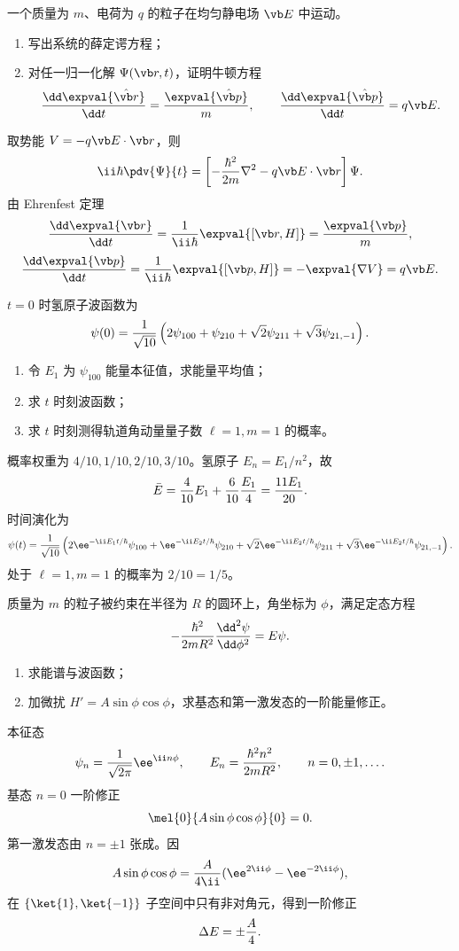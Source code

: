 
\begin{question}
一个质量为 $m$、电荷为 $q$ 的粒子在均匀静电场 $\vb E$ 中运动。
\begin{enumerate}
  \item 写出系统的薛定谔方程；
  \item 对任一归一化解 $\Psi(\vb r,t)$，证明牛顿方程
  \[
    {\dd\expval{\hat{\vb r}}\over\dd t}={\expval{\hat{\vb p}}\over m},
    \qquad {\dd\expval{\hat{\vb p}}\over\dd t}=q\vb E.
  \]
\end{enumerate}
\begin{solution}
取势能 $V=-q\vb E\cdot\vb r$，则
\[
  \ii\hbar\pdv{\Psi}{t}=\left[-{\hbar^2\over2m}\nabla^2-q\vb E\cdot\vb r\right]\Psi.
\]
由 Ehrenfest 定理
\[
  {\dd\expval{\vb r}\over\dd t}={1\over\ii\hbar}\expval{[\vb r,H]}={\expval{\vb p}\over m},
\]
\[
  {\dd\expval{\vb p}\over\dd t}={1\over\ii\hbar}\expval{[\vb p,H]}=-\expval{\nabla V}=q\vb E.
\]
\end{solution}
\end{question}

\begin{question}
$t=0$ 时氢原子波函数为
\[
  \psi(0)={1\over\sqrt{10}}\left(2\psi_{100}+\psi_{210}+\sqrt2\psi_{211}+\sqrt3\psi_{21,-1}\right).
\]
\begin{enumerate}
  \item 令 $E_1$ 为 $\psi_{100}$ 能量本征值，求能量平均值；
  \item 求 $t$ 时刻波函数；
  \item 求 $t$ 时刻测得轨道角动量量子数 $\ell=1,m=1$ 的概率。
\end{enumerate}
\begin{solution}
概率权重为 $4/10,1/10,2/10,3/10$。氢原子 $E_n=E_1/n^2$，故
\[
  \bar E={4\over10}E_1+{6\over10}{E_1\over4}={11E_1\over20}.
\]
时间演化为
\[
  \psi(t)={1\over\sqrt{10}}\left(2\ee^{-\ii E_1t/\hbar}\psi_{100}
  +\ee^{-\ii E_2t/\hbar}\psi_{210}
  +\sqrt2\ee^{-\ii E_2t/\hbar}\psi_{211}
  +\sqrt3\ee^{-\ii E_2t/\hbar}\psi_{21,-1}\right).
\]
处于 $\ell=1,m=1$ 的概率为 $2/10=1/5$。
\end{solution}
\end{question}

\begin{question}
质量为 $m$ 的粒子被约束在半径为 $R$ 的圆环上，角坐标为 $\phi$，满足定态方程
\[
  -{\hbar^2\over2mR^2}{\dd^2\psi\over\dd\phi^2}=E\psi.
\]
\begin{enumerate}
  \item 求能谱与波函数；
  \item 加微扰 $H'=A\sin\phi\cos\phi$，求基态和第一激发态的一阶能量修正。
\end{enumerate}
\begin{solution}
本征态
\[
  \psi_n={1\over\sqrt{2\pi}}\ee^{\ii n\phi},
  \qquad E_n={\hbar^2n^2\over2mR^2},
  \qquad n=0,\pm1,\ldots .
\]
基态 $n=0$ 一阶修正
\[
  \mel{0}{A\sin\phi\cos\phi}{0}=0.
\]
第一激发态由 $n=\pm1$ 张成。因
\[
  A\sin\phi\cos\phi={A\over4\ii}(\ee^{2\ii\phi}-\ee^{-2\ii\phi}),
\]
在 $\{\ket{1},\ket{-1}\}$ 子空间中只有非对角元，得到一阶修正
\[
  \Delta E=\pm {A\over4}.
\]
\end{solution}
\end{question}

